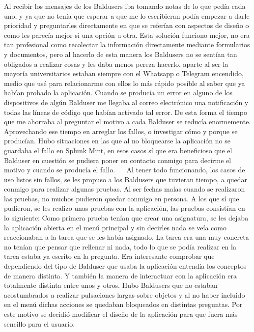 Al recibir los mensajes de los Baldusers iba tomando notas de lo que pedía cada uno, y ya que no tenía que esperar a que me lo escribieran podía empezar a darle prioridad y preguntarles directamente en que se referían con aspectos de diseño o como les parecía mejor si una opción u otra.
Esta solución funciono mejor, no era tan profesional como recolectar la información directamente mediante formularios y documentos, pero al hacerlo de esta manera los Baldusers no  se sentían tan obligados a realizar cosas y les daba menos pereza hacerlo, aparte al ser la mayoría universitarios estaban siempre con el Whatsapp o Telegram encendido, medio que usé para relacionarme con ellos lo más rápido posible al saber que ya habían probado la aplicación.
Cuando se producía un error en alguno de los dispositivos de algún Balduser me llegaba al correo electrónico una notificación y todas las líneas de código que habían activado tal error.
De esta forma el tiempo que me ahorraba al preguntar el motivo a cada Balduser se reducía enormemente.
Aprovechando ese tiempo en arreglar los fallos, o investigar cómo y porque se producían.
Hubo situaciones en las que al no bloquearse la aplicación no se guardaba el fallo en Splunk Mint, en esos casos sí que era beneficioso que el Balduser en cuestión se pudiera poner en contacto conmigo para decirme el motivo y cuando se producía el fallo.
 
Al tener todo funcionando, los casos de uso listos sin fallos, se les propuso a los Baldusers que tuvieran tiempo, a quedar conmigo para realizar algunas pruebas.
Al ser fechas malas cuando se realizaron las pruebas, no muchos pudieron quedar conmigo en persona. A los que sí que pudieron, se les realizo unas pruebas con la aplicación, las pruebas consistían en lo siguiente:
Como primera prueba tenían que crear una asignatura, se les dejaba la aplicación abierta en el menú principal y sin decirles nada se veía como reaccionaban a la tarea que se les había asignado. La tarea era una muy concreta no tenían que pensar que rellenar ni nada, todo lo que se podía realizar en la tarea estaba ya escrito en la pregunta.
Era interesante comprobar que dependiendo del tipo de Balduser que usaba la aplicación entendía los conceptos de manera distinta. Y también la manera de interactuar con la aplicación era totalmente distinta entre unos y otros.
Hubo Baldusers que no estaban acostumbrados a realizar pulsaciones largas sobre objetos y al no haber incluido en el menú dichas acciones se quedaban bloqueados en distintas preguntas.
Por este motivo se decidió modificar el diseño de la aplicación para que fuera más sencillo para el usuario.
